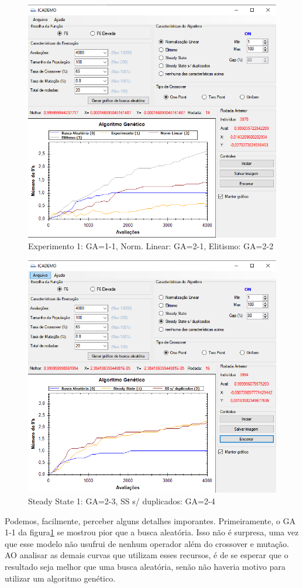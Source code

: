 \documentclass[12pt]{article}
\begin{document}
\begin{figure}[H]
	\centering
	\includegraphics[width=0.7\linewidth]{Imagens/questao1_1}
	\caption{Experimento 1: GA=1-1, Norm. Linear: GA=2-1, Elitismo: GA=2-2}
	\label{fig:questao11}
\end{figure}

\begin{figure}[H]
	\centering
	\includegraphics[width=0.7\linewidth]{Imagens/questao1_2}
	\caption{Steady State 1: GA=2-3, SS s/ duplicados: GA=2-4}
	\label{fig:questao12}
\end{figure}

Podemos, facilmente, perceber alguns detalhes imporantes. Primeiramente, o GA 1-1 da figura\ref{fig:questao11} se mostrou pior que a busca aleatória. Isso não é surpresa,  uma vez que esse modelo não usufrui de nenhum operador além do crossover e mutação. AO analisar as demais curvas que utilizam esses recursos, é de se esperar que o resultado seja melhor que uma busca aleatória, senão não haveria motivo para utilizar um algoritmo genético.
\end{document}

